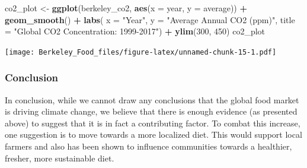 \documentclass[]{article}
\newenvironment{Shaded}{\begin{snugshade}}{\end{snugshade}}
\newcommand{\KeywordTok}[1]{\textcolor[rgb]{0.13,0.29,0.53}{\textbf{#1}}}
\newcommand{\DataTypeTok}[1]{\textcolor[rgb]{0.13,0.29,0.53}{#1}}
\newcommand{\DecValTok}[1]{\textcolor[rgb]{0.00,0.00,0.81}{#1}}
\newcommand{\StringTok}[1]{\textcolor[rgb]{0.31,0.60,0.02}{#1}}
\newcommand{\OperatorTok}[1]{\textcolor[rgb]{0.81,0.36,0.00}{\textbf{#1}}}
\newcommand{\NormalTok}[1]{#1}
\begin{document}
\begin{Shaded}
\begin{Highlighting}[]
\NormalTok{co2_plot <-}
\KeywordTok{ggplot}\NormalTok{(berkeley_co2, }\KeywordTok{aes}\NormalTok{(}\DataTypeTok{x =}\NormalTok{ year, }\DataTypeTok{y =}\NormalTok{ average)) }\OperatorTok{+}\StringTok{ }\KeywordTok{geom_smooth}\NormalTok{() }\OperatorTok{+}
\StringTok{  }\KeywordTok{labs}\NormalTok{( }\DataTypeTok{x =} \StringTok{"Year"}\NormalTok{, }\DataTypeTok{y =} \StringTok{"Average Annual CO2 (ppm)"}\NormalTok{, }\DataTypeTok{title =} \StringTok{"Global CO2 Concentration: 1999-2017"}\NormalTok{) }\OperatorTok{+}\StringTok{ }\KeywordTok{ylim}\NormalTok{(}\DecValTok{300}\NormalTok{, }\DecValTok{450}\NormalTok{) }
\NormalTok{co2_plot}
\end{Highlighting}
\end{Shaded}

\texttt{[image: Berkeley\_Food\_files/figure-latex/unnamed-chunk-15-1.pdf]}

\subsubsection{Conclusion}\label{conclusion}

In conclusion, while we cannot draw any conclusions that the global food
market is driving climate change, we believe that there is enough
evidence (as presented above) to suggest that it is in fact a
contributing factor. To combat this increase, one suggestion is to move
towards a more localized diet. This would support local farmers and also
has been shown to influence communities towards a healthier, fresher,
more sustainable diet.
\end{document}
